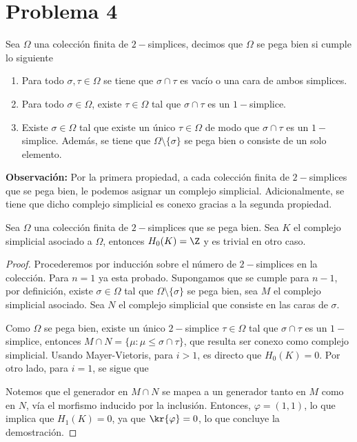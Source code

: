 \documentclass{article}
\begin{document}
\section*{Problema 4}
\noindent Sea $\Omega$ una colección finita de $2-$simplices, decimos que $\Omega$ se pega bien si 
cumple lo siguiente
\begin{enumerate}
    \item Para todo $\sigma,\tau\in\Omega$ se tiene que $\sigma\cap\tau$ es vacío o una cara de 
    ambos simplices.
    \item Para todo $\sigma\in\Omega$, existe $\tau\in\Omega$ tal que $\sigma\cap\tau$ es un 
    $1-$simplice.
    \item Existe $\sigma\in\Omega$ tal que existe un único $\tau\in\Omega$ de modo que 
    $\sigma\cap\tau$ es un $1-$simplice. Además, se tiene que $\Omega\setminus\{\sigma\}$ se pega 
    bien o consiste de un solo elemento.
\end{enumerate}
\noindent\textbf{Observación:} Por la primera propiedad, a cada colección finita de 
$2-$simplices que se pega bien, le podemos asignar un complejo simplicial. Adicionalmente, se 
tiene que dicho complejo simplicial es conexo gracias a la segunda propiedad.

\vspace{2mm}
\begin{lema}
    Sea $\Omega$ una colección finita de $2-$simplices que se pega bien. Sea $K$ el complejo 
    simplicial asociado a $\Omega$, entonces $H_{0}(K)=\Z$ y es trivial en otro caso.
\end{lema}
\begin{proof}
    Procederemos por inducción sobre el número de $2-$simplices en la colección. Para $n=1$ ya
    esta probado. Supongamos que se cumple para $n-1$, por definición, existe $\sigma\in\Omega$ 
    tal que $\Omega\setminus\{\sigma\}$ se pega bien, sea $M$ el complejo simplicial asociado. Sea
    $N$ el complejo simplicial que consiste en las caras de $\sigma$.

    \vspace{1mm}
    Como $\Omega$ se pega bien, existe un único $2-$simplice $\tau\in\Omega$ tal que 
    $\sigma\cap\tau$ es un $1-$simplice, entonces $M\cap N=\{\mu:\mu\leq\sigma\cap\tau\}$, que 
    resulta ser conexo como complejo simplicial. Usando Mayer-Vietoris, para $i>1$, es directo
    que $H_{0}(K)=0$. Por otro lado, para $i=1$, se sigue que

    \vspace{2mm}
    \centerline{
    }
    
    \vspace{1mm}
    Notemos que el generador en $M\cap N$ se mapea a un generador tanto en $M$ como en $N$, vía el
    morfismo inducido por la inclusión. Entonces, $\varphi=(1,1)$, lo que implica que 
    $H_{1}(K)=0$, ya que $\kr{\varphi}=0$, lo que concluye la demostración.
\end{proof}
\end{document}
